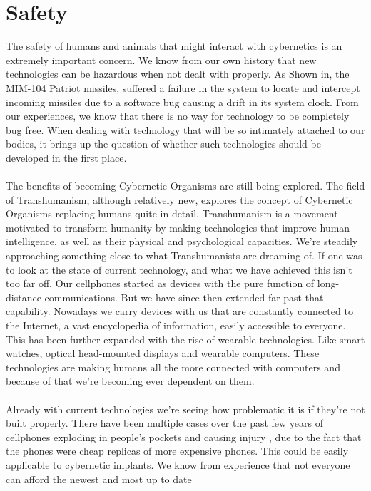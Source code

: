 \documentclass[12pt,a4paper,notitlepage]{article}
\begin{document}
\section{Safety}
The safety of humans and animals that might interact with cybernetics is an
extremely important concern. We know from our own history that new technologies
can be hazardous when not dealt with properly. As Shown in, the MIM-104 Patriot
missiles, suffered a failure in the system to locate and intercept incoming
missiles due to a software bug causing a drift in its system clock. From our
experiences, we know that there is no way for technology to be completely bug
free. When dealing with technology that will be so intimately attached to our
bodies, it brings up the question of whether such technologies should be
developed in the first place. 
\\\\
The benefits of becoming Cybernetic Organisms are still being explored. The
field of Transhumanism\cite{Transhumanism}, although relatively new, explores
the concept of Cybernetic Organisms replacing humans quite in detail.
Transhumanism is a movement motivated to transform humanity by making
technologies that improve human intelligence, as well as their physical and
psychological capacities. We're steadily approaching something close to what
Transhumanists are dreaming of. If one was to look at the state of current
technology, and what we have achieved this isn't too far off. Our cellphones
started as devices with the pure function of long-distance communications. But
we have since then extended far past that capability. Nowadays we carry devices
with us that are constantly connected to the Internet, a vast encyclopedia of
information, easily accessible to everyone. This has been further expanded with
the rise of wearable technologies. Like smart watches, optical head-mounted
displays and wearable computers. These technologies are making humans all the
more connected with computers and because of that we're becoming ever dependent
on them.
\\\\
Already with current technologies we're seeing how problematic it is if they're
not built properly. There have been multiple cases over the past few years of
cellphones exploding in people's pockets and causing injury \cite{exploding
cellphone}, due to the fact that the phones were cheap replicas of more
expensive phones. This could be easily applicable to cybernetic implants. We
know from experience that not everyone can afford the newest and most up to date
\end{document}
